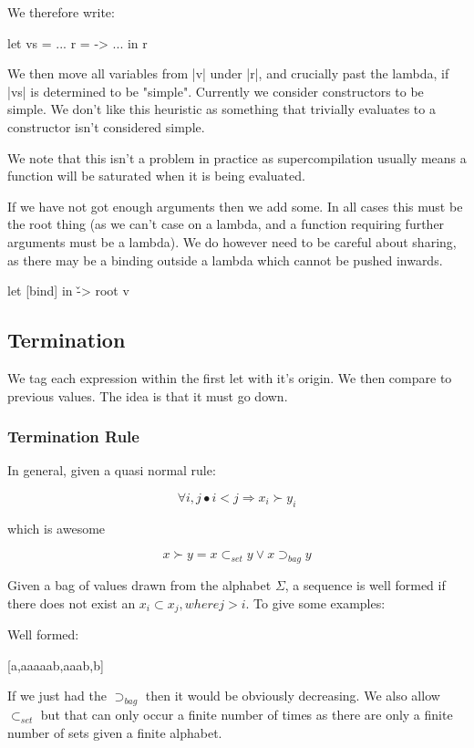 \documentclass{sigplanconf}
\begin{document}
We therefore write:

\begin{code}
let vs  = ...
    r  = \x -> ...
in r
\end{code}

We then move all variables from |v| under |r|, and crucially past the lambda, if |vs| is determined to be "simple". Currently we consider constructors to be simple. We don't like this heuristic as something that trivially evaluates to a constructor isn't considered simple.

We note that this isn't a problem in practice as supercompilation usually means a function will be saturated when it is being evaluated.


If we have not got enough arguments then we add some. In all cases this must be the root thing (as we can't case on a lambda, and a function requiring further arguments must be a lambda). We do however need to be careful about sharing, as there may be a binding outside a lambda which cannot be pushed inwards.

\begin{code}
let [bind]
in \v -> root v
\end{code}


\subsection{Termination}
\label{sec:term}

We tag each expression within the first let with it's origin. We then compare to previous values. The idea is that it must go down.

\subsubsection{Termination Rule}

In general, given a quasi normal rule:

\[
\forall i, j \bullet i < j \Rightarrow x_i \succ y_i
\]

which is awesome

\[
x \succ y = x \subset_{set} y \vee x \supset_{bag} y
\]

Given a bag of values drawn from the alphabet $\Sigma$, a sequence is well formed if there does not exist an $x_i \subset x_j, where j > i$. To give some examples:

Well formed:

[a,aaaaab,aaab,b]

If we just had the $\supset_{bag}$ then it would be obviously decreasing. We also allow $\subset_{set}$ but that can only occur a finite number of times as there are only a finite number of sets given a finite alphabet.
\end{document}
